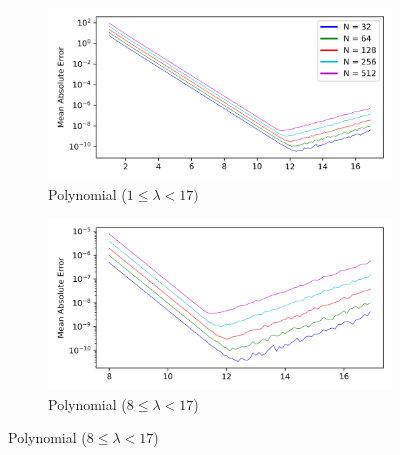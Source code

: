 \documentclass[a4paper]{report}
\begin{document}
\begin{figure}[H]
    \begin{subfigure}{.45\linewidth}
      \includegraphics[width=\linewidth]{images/abate_whitt/polynomial.png}
      \caption{Polynomial ($1 \leq \lambda < 17)$}
    \end{subfigure}\hfill
    \begin{subfigure}{.45\linewidth}
      \includegraphics[width=\linewidth]{images/abate_whitt/polynomial_zoomed.png}
      \caption{Polynomial ($8 \leq \lambda < 17$)}
    \end{subfigure}
    
    \medskip
    

\end{figure}
\end{document}
